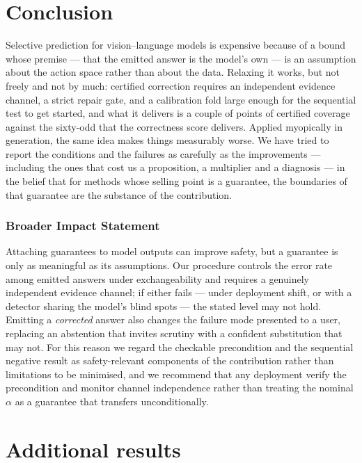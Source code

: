 \documentclass[review,number,doubleblind]{elsarticle}
\theoremstyle{plain}
\theoremstyle{definition}
\theoremstyle{remark}
\begin{document}
\section{Conclusion}

Selective prediction for vision--language models is expensive because of a bound whose
premise --- that the emitted answer is the model's own --- is an assumption about the action
space rather than about the data. Relaxing it works, but not freely and not by much: certified
correction requires an independent evidence channel, a strict repair gate, and a calibration fold
large enough for the sequential test to get started, and what it delivers is a couple of points
of certified coverage against the sixty-odd that the correctness score delivers. Applied
myopically in generation, the same idea makes things measurably worse. We have tried to report the
conditions and the failures as carefully as the improvements --- including the ones that cost us a
proposition, a multiplier and a diagnosis --- in the belief that for methods whose selling point
is a guarantee, the boundaries of that guarantee are the substance of the contribution.

\subsubsection*{Broader Impact Statement}
Attaching guarantees to model outputs can improve safety, but a guarantee is only as
meaningful as its assumptions. Our procedure controls the error rate among emitted answers
under exchangeability and requires a genuinely independent evidence channel; if either
fails --- under deployment shift, or with a detector sharing the model's blind spots --- the
stated level may not hold. Emitting a \emph{corrected} answer also changes the failure mode
presented to a user, replacing an abstention that invites scrutiny with a confident
substitution that may not. For this reason we regard the checkable precondition and the
sequential negative result as safety-relevant components of the contribution rather than
limitations to be minimised, and we recommend that any deployment verify the precondition
and monitor channel independence rather than treating the nominal $\alpha$ as a guarantee
that transfers unconditionally.
\appendix
\section{Additional results}
\end{document}
